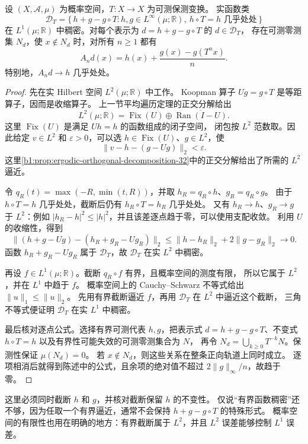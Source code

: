 \begin{lemma}[可直接求平均的稠密类]
\label{b1:lem:ergodic-dense-class-32}
设 \((X,\mathcal A,\mu)\) 为概率空间，\(T:X\to X\) 为可测保测变换。
实函数类
\[
 \mathcal D_T=
 \{\,h+g-g\circ T:
      h,g\in L^\infty(\mu;\mathbb R),\ h\circ T=h\text{ 几乎处处}\,\}
\]
在 \(L^1(\mu;\mathbb R)\) 中稠密。对每个表示为 \(d=h+g-g\circ T\) 的 \(d\in\mathcal D_T\)，
存在可测零测集 \(N_d\)，使 \(x\notin N_d\) 时，对所有 \(n\geq1\) 都有
\[
 A_nd(x)=h(x)+\frac{g(x)-g(T^nx)}n.
\]
特别地，\(A_nd\to h\) 几乎处处。
\end{lemma}
\begin{proof}
先在实 Hilbert 空间 \(L^2(\mu;\mathbb R)\) 中工作。
Koopman 算子 \(Ug=g\circ T\) 是等距算子，因而是收缩算子。
上一节平均遍历定理的正交分解给出
\[
 L^2(\mu;\mathbb R)=\operatorname{Fix}(U)
       \mathbin{\oplus}\overline{\operatorname{Ran}(I-U)}.
\]
这里 \(\operatorname{Fix}(U)\) 是满足 \(Uh=h\) 的函数组成的闭子空间，
闭包按 \(L^2\) 范数取。因此给定 \(v\in L^2\) 和 \(\varepsilon>0\)，可以选
\(h\in\operatorname{Fix}(U)\)、\(g\in L^2\)，使
\[
 \|v-h-(g-Ug)\|_2<\varepsilon.
\]
这里\cref{b1:prop:ergodic-orthogonal-decomposition-32}中的正交分解给出了所需的 \(L^2\) 逼近。

令 \(q_R(t)=\max(-R,\min(t,R))\)，并取 \(h_R=q_R\circ h\)、\(g_R=q_R\circ g\)。
由于 \(h\circ T=h\) 几乎处处，截断后仍有 \(h_R\circ T=h_R\) 几乎处处。
又有 \(h_R\to h\)、\(g_R\to g\) 于 \(L^2\)：例如
\(|h_R-h|^2\leq|h|^2\)，并且该差逐点趋于零，可以使用支配收敛。
利用 \(U\) 的收缩性，得到
\[
 \|(h+g-Ug)-(h_R+g_R-Ug_R)\|_2
 \leq\|h-h_R\|_2+2\|g-g_R\|_2\longrightarrow0.
\]
函数 \(h_R+g_R-Ug_R\) 属于 \(\mathcal D_T\)，故 \(\mathcal D_T\) 在实 \(L^2\) 中稠密。

再设 \(f\in L^1(\mu;\mathbb R)\)。截断 \(q_R\circ f\) 有界，且概率空间的测度有限，
所以它属于 \(L^2\)，并在 \(L^1\) 中趋于 \(f\)。
概率空间上的 Cauchy--Schwarz 不等式给出 \(\|u\|_1\leq\|u\|_2\)。
先用有界截断逼近 \(f\)，再用 \(\mathcal D_T\) 在 \(L^2\) 中逼近这个截断，
三角不等式便证明 \(\mathcal D_T\) 在实 \(L^1\) 中稠密。

最后核对逐点公式。选择有界可测代表 \(h,g\)，把表示式
\(d=h+g-g\circ T\)、不变式 \(h\circ T=h\) 以及有界性可能失效的可测零测集合为 \(N\)，
再令 \(N_d=\bigcup_{k\geq0}T^{-k}N\)。保测性保证 \(\mu(N_d)=0\)。
若 \(x\notin N_d\)，则这些关系在整条正向轨道上同时成立。
逐项相消后就得到陈述中的公式，且余项的绝对值不超过 \(2\|g\|_\infty/n\)，故趋于零。
\end{proof}

这里必须同时截断 \(h\) 和 \(g\)，并核对截断保留 \(h\) 的不变性。
仅说“有界函数稠密”还不够，因为任取一个有界逼近，通常不会保持
\(h+g-g\circ T\) 的特殊形式。
概率空间的有限性也用在明确的地方：有界截断属于 \(L^2\)，并且 \(L^2\) 误差能够控制 \(L^1\) 误差。

